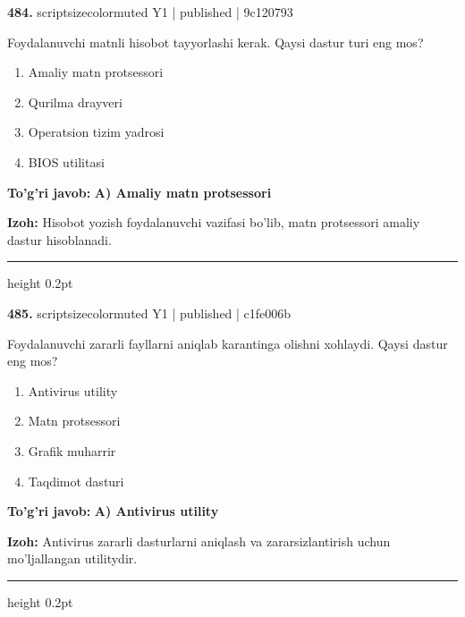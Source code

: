 \documentclass[10pt,a4paper]{article}
\begin{document}
{\bfseries\sffamily\color{ink} 484.} {scriptsizecolor{muted} Y1 | published | 9c120793}
\par
Foydalanuvchi matnli hisobot tayyorlashi kerak. Qaysi dastur turi eng mos?
\begin{enumerate}[label=\Alph*),leftmargin=9mm]
\item Amaliy matn protsessori
\item Qurilma drayveri
\item Operatsion tizim yadrosi
\item BIOS utilitasi
\end{enumerate}
\begin{tcolorbox}[enhanced,breakable,colback=teal!4,colframe=teal!60!black,boxrule=0.45pt,arc=1.2mm,left=2.7mm,right=2.7mm,top=1.8mm,bottom=1.8mm,before skip=2mm,after skip=2mm]
{\bfseries\sffamily\color{teal}To'g'ri javob:} \textbf{A) Amaliy matn protsessori}
\par\smallskip
{\bfseries Izoh:} Hisobot yozish foydalanuvchi vazifasi bo'lib, matn protsessori amaliy dastur hisoblanadi.
\end{tcolorbox}
\vspace{2mm}\hrule height 0.2pt\vspace{3mm}

{\bfseries\sffamily\color{ink} 485.} {scriptsizecolor{muted} Y1 | published | c1fe006b}
\par
Foydalanuvchi zararli fayllarni aniqlab karantinga olishni xohlaydi. Qaysi dastur eng mos?
\begin{enumerate}[label=\Alph*),leftmargin=9mm]
\item Antivirus utility
\item Matn protsessori
\item Grafik muharrir
\item Taqdimot dasturi
\end{enumerate}
\begin{tcolorbox}[enhanced,breakable,colback=teal!4,colframe=teal!60!black,boxrule=0.45pt,arc=1.2mm,left=2.7mm,right=2.7mm,top=1.8mm,bottom=1.8mm,before skip=2mm,after skip=2mm]
{\bfseries\sffamily\color{teal}To'g'ri javob:} \textbf{A) Antivirus utility}
\par\smallskip
{\bfseries Izoh:} Antivirus zararli dasturlarni aniqlash va zararsizlantirish uchun mo'ljallangan utilitydir.
\end{tcolorbox}
\vspace{2mm}\hrule height 0.2pt\vspace{3mm}
\end{document}
